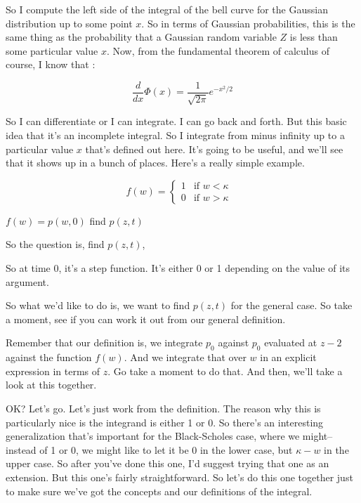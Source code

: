 \documentclass{article}
\begin{document}
So I compute the left side of the integral
of the bell curve for the Gaussian distribution
up to some point $x$.
So in terms of Gaussian probabilities,
this is the same thing as the probability
that a Gaussian random variable $Z$ is less
than some particular value $x$.
Now, from the fundamental theorem of calculus of course,
I know that :

$$ \frac{d}{dx}\Phi(x) =  \frac{1}{\sqrt{2 \pi}} e^{-x^2/2} $$


So I can differentiate or I can integrate.
I can go back and forth.
But this basic idea that it's an incomplete integral.
So I integrate from minus infinity
up to a particular value $x$ that's defined out here.
It's going to be useful, and we'll
see that it shows up in a bunch of places.
Here's a really simple example.


\begin{equation*}
	f(w) =
	\begin{cases}
		1 & \text{if $w<\kappa$ }\\
		0 & \text{if $w>\kappa$}
	\end{cases}       
\end{equation*}

$ f(w) = p(w,0)$  find $p(z,t)$

So the question is, find $p(z,t)$,

So at time 0, it's a step function.
It's either 0 or 1 depending on the value of its argument.

So what we'd like to do is, we want to find $p(z,t)$
for the general case.
So take a moment, see if you can work it out
from our general definition.




Remember that our definition is, we integrate $p_0$
against $p_0$ evaluated at $z-2$ against the function $f(w)$.
And we integrate that over $w$ in an explicit expression
in terms of $z$.
Go take a moment to do that.
And then, we'll take a look at this together.

OK?
Let's go.
Let's just work from the definition.
The reason why this is particularly nice
is the integrand is either 1 or 0.
So there's an interesting generalization
that's important for the Black-Scholes case, where
we might-- instead of 1 or 0, we might
like to let it be 0 in the lower case, but $\kappa-w$
in the upper case.
So after you've done this one, I'd
suggest trying that one as an extension.
But this one's fairly straightforward.
So let's do this one together just
to make sure we've got the concepts and our definitions
of the integral.
\end{document}
